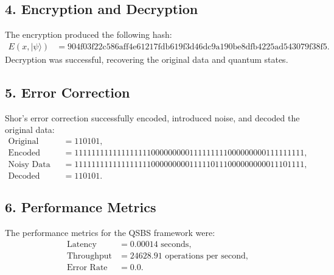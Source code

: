\documentclass{article}
\begin{document}
\subsection*{4. Encryption and Decryption}
The encryption produced the following hash:
\begin{align*}
E(x, |\psi\rangle) &= \text{904f03f22c586aff4e61217fdb619f3d46dc9a190be8dfb4225ad543079f38f5}.
\end{align*}
Decryption was successful, recovering the original data and quantum states.

\subsection*{5. Error Correction}
Shor's error correction successfully encoded, introduced noise, and decoded the original data:
\begin{align*}
\text{Original Data} &= 110101, \\
\text{Encoded Data} &= 111111111111111111000000000111111111000000000111111111, \\
\text{Noisy Data} &= 111111111111111111000000000111110111000000000011101111, \\
\text{Decoded Data} &= 110101.
\end{align*}

\subsection*{6. Performance Metrics}
The performance metrics for the QSBS framework were:
\begin{align*}
\text{Latency} &= 0.00014 \text{ seconds}, \\
\text{Throughput} &= 24628.91 \text{ operations per second}, \\
\text{Error Rate} &= 0.0.
\end{align*}
\end{document}
